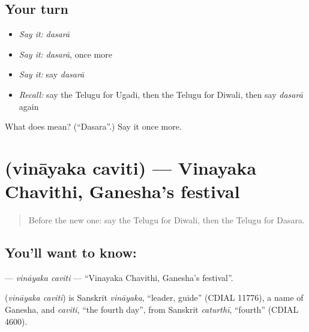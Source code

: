 \subsection*{Your turn}
\begin{itemize}
\raggedright
  \item \emph{Say it:} \emph{dasarā}
  \item \emph{Say it:} \emph{dasarā}, once more
  \item \emph{Say it:} say \emph{dasarā}
  \item \emph{Recall:} say the Telugu for Ugadi, then the Telugu for Diwali, then say \emph{dasarā} again
\end{itemize}

\begin{tcolorbox}[breakable,colback=teal!4,colframe=teal!35!black,title={Before you move on}]
What does  mean? (\textquotedblleft{}Dasara\textquotedblright{}.) Say it once more.
\end{tcolorbox}
\section[\texorpdfstring{\te{వినాయక} \te{చవితి} (vināyaka caviti)}{వినాయక చవితి (vināyaka caviti)}]{  (vināyaka caviti) — Vinayaka Chavithi, Ganesha's festival}

\label{lesson:TE-C252-vinayaka-caviti}



\begin{quote}
Before the new one: say the Telugu for Diwali, then the Telugu for Dasara.
\end{quote}

\subsection*{You'll want to know:  }
\textbf{ } — \emph{vināyaka caviti} — \textquotedblleft{}Vinayaka Chavithi, Ganesha's festival\textquotedblright{}.

\begin{cousinweb}
\textbf{ } (\emph{vināyaka caviti}) is Sanskrit \emph{vināyaka}, \textquotedblleft{}leader, guide\textquotedblright{} (CDIAL 11776), a name of Ganesha, and \emph{caviti}, \textquotedblleft{}the fourth day\textquotedblright{}, from Sanskrit \emph{caturthī}, \textquotedblleft{}fourth\textquotedblright{} (CDIAL 4600).
\end{cousinweb}

